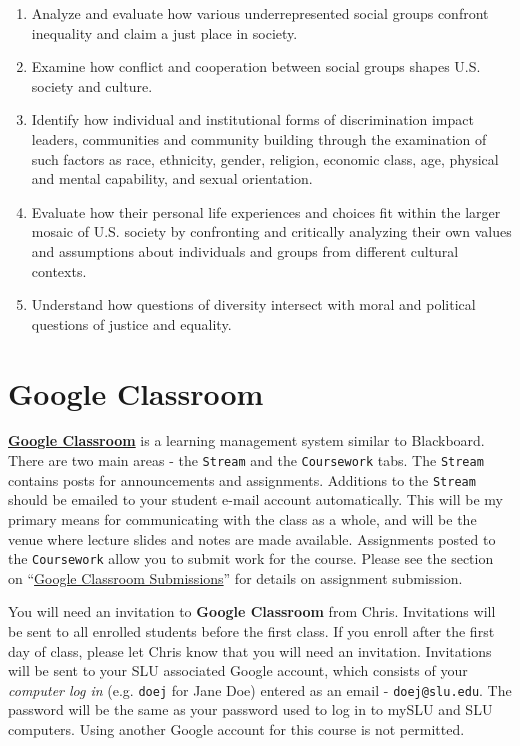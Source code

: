 \documentclass[]{book}
\begin{document}
\begin{enumerate}
\def\labelenumi{\arabic{enumi}.}
\item
  Analyze and evaluate how various underrepresented social groups confront inequality and claim a just place in society.
\item
  Examine how conflict and cooperation between social groups shapes U.S. society and culture.
\item
  Identify how individual and institutional forms of discrimination impact leaders, communities and community building through the examination of such factors as race, ethnicity, gender, religion, economic class, age, physical and mental capability, and sexual orientation.
\item
  Evaluate how their personal life experiences and choices fit within the larger mosaic of U.S. society by confronting and critically analyzing their own values and assumptions about individuals and groups from different cultural contexts.
\item
  Understand how questions of diversity intersect with moral and political questions of justice and equality.
\end{enumerate}

\hypertarget{google-classroom}{%
\section{Google Classroom}\label{google-classroom}}

\textbf{\href{https://classroom.google.com}{Google Classroom}} is a learning management system similar to Blackboard. There are two main areas - the \texttt{Stream} and the \texttt{Coursework} tabs. The \texttt{Stream} contains posts for announcements and assignments. Additions to the \texttt{Stream} should be emailed to your student e-mail account automatically. This will be my primary means for communicating with the class as a whole, and will be the venue where lecture slides and notes are made available. Assignments posted to the \texttt{Coursework} allow you to submit work for the course. Please see the section on ``\protect\hyperlink{google-classroom-submissions}{Google Classroom Submissions}'' for details on assignment submission.

You will need an invitation to \textbf{Google Classroom} from Chris. Invitations will be sent to all enrolled students before the first class. If you enroll after the first day of class, please let Chris know that you will need an invitation. Invitations will be sent to your SLU associated Google account, which consists of your \emph{computer log in} (e.g. \texttt{doej} for Jane Doe) entered as an email - \texttt{doej@slu.edu}. The password will be the same as your password used to log in to mySLU and SLU computers. Using another Google account for this course is not permitted.
\end{document}
